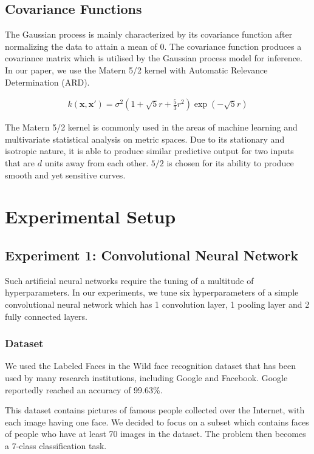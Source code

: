 \documentclass[letterpaper]{article}
\begin{document}
\subsection{Covariance Functions}
The Gaussian process is mainly characterized by its covariance function after normalizing the data to attain a mean of 0. The covariance function produces a covariance matrix which is utilised by the Gaussian process model for inference.
In our paper, we use the Matern 5/2 kernel with Automatic Relevance Determination (ARD).

\begin{align*}
	k (\textbf{x},\textbf{x}') = \sigma^2(1+\sqrt5r+\frac{5}{3}r^2)\exp(-\sqrt5r)
\end{align*}

The Matern 5/2 kernel is commonly used in the areas of machine learning and multivariate statistical analysis on metric spaces. Due to its stationary and isotropic nature, it is able to produce similar predictive output for two inputs that are $d$ units away from each other. $5/2$ is chosen for its ability to produce smooth and yet sensitive curves.

\section{Experimental Setup}

\subsection{Experiment 1: Convolutional Neural Network}
Such artificial neural networks require the tuning of a multitude of hyperparameters.
In our experiments, we tune six hyperparameters of a simple convolutional neural 
network which has 1 convolution layer, 1 pooling layer and 2 fully connected layers.

\subsubsection{Dataset}
We used the Labeled Faces in the Wild face recognition dataset that has been used
by many research institutions, including Google and Facebook. Google reportedly 
reached an accuracy of 99.63\%.

This dataset contains pictures of famous people collected over the Internet, with 
each image having one face. We decided to focus on a subset which contains faces 
of people who have at least 70 images in the dataset. The problem then becomes 
a 7-class classification task.
\end{document}
